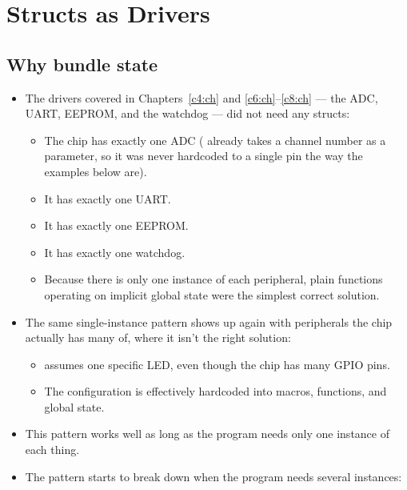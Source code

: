 
\section{Structs as Drivers}
\label{c9:sec:structs}\label{c9:app:a}

\subsection{Why bundle state}
\label{c9:a:1}
\begin{itemize}
  \item The drivers covered in Chapters~\ref{c4:ch} and \ref{c6:ch}--\ref{c8:ch} --- the ADC,
    UART, EEPROM, and the watchdog --- did not need any structs:
  \begin{itemize}
    \item The chip has exactly one ADC ( already takes a channel number as a
      parameter, so it was never hardcoded to a single pin the way the examples below are).
    \item It has exactly one UART.
    \item It has exactly one EEPROM.
    \item It has exactly one watchdog.
    \item Because there is only one instance of each peripheral, plain functions operating on
      implicit global state were the simplest correct solution.
  \end{itemize}
  \item The same single-instance pattern shows up again with peripherals the chip actually has
    many of, where it isn't the right solution:
  \begin{itemize}
    \item {} assumes one specific LED, even though the chip has many GPIO pins.
    \item The configuration is effectively hardcoded into macros, functions, and global state.
  \end{itemize}
  \item This pattern works well as long as the program needs only one instance of each thing.
  \item The pattern starts to break down when the program needs several instances:

\end{itemize}
